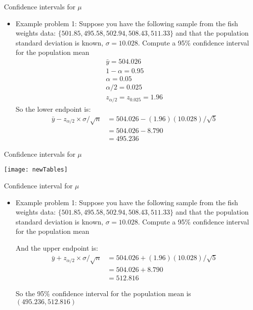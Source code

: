 \documentclass[xcolor=dvipsnames]{beamer}
\begin{document}
\begin{frame}{Confidence intervals for $\mu$}
	\begin{itemize}
		\item Example problem 1: Suppose you have the following sample from the fish weights data: $\{501.85, 495.58, 502.94, 508.43, 511.33 \}$ and that the population standard deviation is known, $\sigma = 10.028$. Compute a 95\% confidence interval for the population mean  \pause
		\begin{gather*}
			\bar{y} = 504.026 \\
			1 - \alpha = 0.95 \\
			\alpha = 0.05 \\
			\alpha / 2 = 0.025 \\
			z_{\alpha / 2} = z_{0.025} = 1.96 
		\end{gather*} \pause
		So the lower endpoint is:  \pause
		\begin{align*}
			\bar{y} - z_{\alpha / 2} \times \sigma / \sqrt{n} &= 504.026 - (1.96)(10.028)/\sqrt{5} \\
			&= 504.026 - 8.790 \\
			&= 495.236
		\end{align*}
	\end{itemize}
\end{frame}

\begin{frame}{Confidence intervals for $\mu$}
	\begin{center}
		\texttt{[image: newTables]}
	\end{center}
\end{frame}

\begin{frame}{Confidence interval for $\mu$}
	\begin{itemize}
		\item Example problem 1: Suppose you have the following sample from the fish weights data: $\{501.85, 495.58, 502.94, 508.43, 511.33 \}$ and that the population standard deviation is known, $\sigma = 10.028$. Compute a 95\% confidence interval for the population mean\\ \vspace{10pt}
		
		And the upper endpoint is:  \pause
		\begin{align*}
		\bar{y} + z_{\alpha / 2} \times \sigma / \sqrt{n} &= 504.026 + (1.96)(10.028)/\sqrt{5} \\
		&= 504.026 + 8.790 \\
		&= 512.816
		\end{align*}  \pause
		
		So the 95\% confidence interval for the population mean is $(495.236, 512.816)$
	\end{itemize}
\end{frame}
\end{document}
